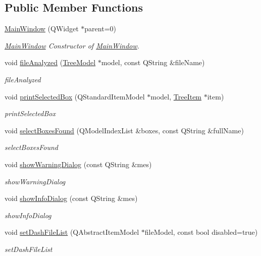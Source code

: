 \subsection*{Public Member Functions}
\begin{DoxyCompactItemize}
\item 
\hyperlink{class_main_window_a8b244be8b7b7db1b08de2a2acb9409db}{Main\-Window} (Q\-Widget $\ast$parent=0)
\begin{DoxyCompactList}\small\item\em \hyperlink{class_main_window}{Main\-Window} Constructor of \hyperlink{class_main_window}{Main\-Window}. \end{DoxyCompactList}\item 
void \hyperlink{class_main_window_a9757b11e83740195027a8fe486e9f221}{file\-Analyzed} (\hyperlink{class_tree_model}{Tree\-Model} $\ast$model, const Q\-String \&file\-Name)
\begin{DoxyCompactList}\small\item\em file\-Analyzed \end{DoxyCompactList}\item 
void \hyperlink{class_main_window_a8a8ff9ef51b23c7fff3102ae6c0f5fdf}{print\-Selected\-Box} (Q\-Standard\-Item\-Model $\ast$model, \hyperlink{class_tree_item}{Tree\-Item} $\ast$item)
\begin{DoxyCompactList}\small\item\em print\-Selected\-Box \end{DoxyCompactList}\item 
void \hyperlink{class_main_window_a199be1af8e0e67ce6b8cba1f16985419}{select\-Boxes\-Found} (Q\-Model\-Index\-List \&boxes, const Q\-String \&full\-Name)
\begin{DoxyCompactList}\small\item\em select\-Boxes\-Found \end{DoxyCompactList}\item 
void \hyperlink{class_main_window_a0689a36479aab4d796a075f4e19e943c}{show\-Warning\-Dialog} (const Q\-String \&mes)
\begin{DoxyCompactList}\small\item\em show\-Warning\-Dialog \end{DoxyCompactList}\item 
void \hyperlink{class_main_window_aad00715d0134957d18cc8b2cfafc99ad}{show\-Info\-Dialog} (const Q\-String \&mes)
\begin{DoxyCompactList}\small\item\em show\-Info\-Dialog \end{DoxyCompactList}\item 
void \hyperlink{class_main_window_a01d701eed725194421c397b3d5ad77ce}{set\-Dash\-File\-List} (Q\-Abstract\-Item\-Model $\ast$file\-Model, const bool disabled=true)
\begin{DoxyCompactList}\small\item\em set\-Dash\-File\-List \end{DoxyCompactList}\end{DoxyCompactItemize}


